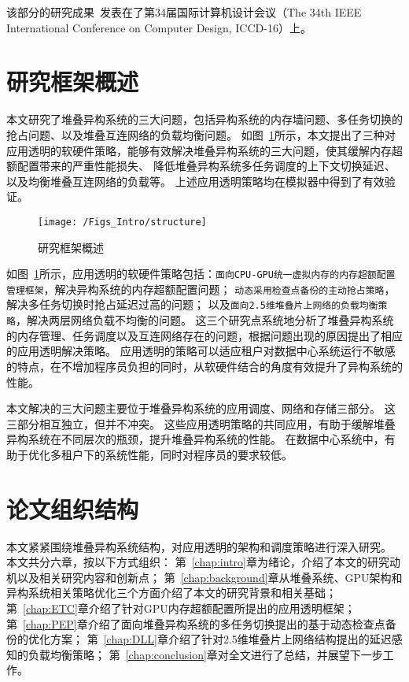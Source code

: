 该部分的研究成果~发表在了第34届国际计算机设计会议（The 34th IEEE International Conference on Computer Design, ICCD-16）上。

\section{研究框架概述}

本文研究了堆叠异构系统的三大问题，包括异构系统的内存墙问题、多任务切换的抢占问题、以及堆叠互连网络的负载均衡问题。
如图~\ref{fig:structure}所示，本文提出了三种对应用透明的软硬件策略，能够有效解决堆叠异构系统的三大问题，使其缓解内存超额配置带来的严重性能损失、
降低堆叠异构系统多任务调度的上下文切换延迟、以及均衡堆叠互连网络的负载等。
上述应用透明策略均在模拟器中得到了有效验证。

\begin{figure}[htbp] %
  \centering
  \texttt{[image: /Figs\_Intro/structure]}
  \caption{研究框架概述}
  \label{fig:structure}
\end{figure}

如图~\ref{fig:structure}所示，应用透明的软硬件策略包括：\texttt{面向CPU-GPU统一虚拟内存的内存超额配置管理框架}，解决异构系统的内存超额配置问题；
\texttt{动态采用检查点备份的主动抢占策略}，解决多任务切换时抢占延迟过高的问题；
以及\texttt{面向2.5维堆叠片上网络的负载均衡策略}，解决两层网络负载不均衡的问题。
这三个研究点系统地分析了堆叠异构系统的内存管理、任务调度以及互连网络存在的问题，根据问题出现的原因提出了相应的应用透明解决策略。
应用透明的策略可以适应租户对数据中心系统运行不敏感的特点，在不增加程序员负担的同时，从软硬件结合的角度有效提升了异构系统的性能。


本文解决的三大问题主要位于堆叠异构系统的应用调度、网络和存储三部分。
这三部分相互独立，但并不冲突。
这些应用透明策略的共同应用，有助于缓解堆叠异构系统在不同层次的瓶颈，提升堆叠异构系统的性能。
在数据中心系统中，有助于优化多租户下的系统性能，同时对程序员的要求较低。




\section{论文组织结构}
本文紧紧围绕堆叠异构系统结构，对应用透明的架构和调度策略进行深入研究。
本文共分六章，按以下方式组织：
第~\ref{chap:intro}章为绪论，介绍了本文的研究动机以及相关研究内容和创新点；
第~\ref{chap:background}章从堆叠系统、GPU架构和异构系统相关策略优化三个方面介绍了本文的研究背景和相关基础；
第~\ref{chap:ETC}章介绍了针对GPU内存超额配置所提出的应用透明框架；
第~\ref{chap:PEP}章介绍了面向堆叠异构系统的多任务切换提出的基于动态检查点备份的优化方案；
第~\ref{chap:DLL}章介绍了针对2.5维堆叠片上网络结构提出的延迟感知的负载均衡策略；
第~\ref{chap:conclusion}章对全文进行了总结，并展望下一步工作。

